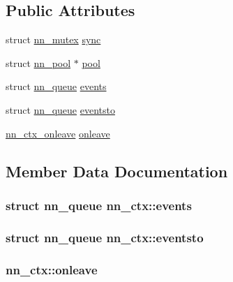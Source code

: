 \subsection*{Public Attributes}
\begin{DoxyCompactItemize}
\item 
struct \hyperlink{structnn__mutex}{nn\+\_\+mutex} \hyperlink{structnn__ctx_a264057ae180e58357895cbcbd594101b}{sync}
\item 
struct \hyperlink{structnn__pool}{nn\+\_\+pool} $\ast$ \hyperlink{structnn__ctx_a19a7c8ad423a87033ddf12550c1d3bec}{pool}
\item 
struct \hyperlink{structnn__queue}{nn\+\_\+queue} \hyperlink{structnn__ctx_ae1142dc4694c701a581532111589add2}{events}
\item 
struct \hyperlink{structnn__queue}{nn\+\_\+queue} \hyperlink{structnn__ctx_a68de02831fae8dea24d3183c1c4a21ea}{eventsto}
\item 
\hyperlink{ctx_8h_ab63830bf02229318481d9ce1f27bf1ea}{nn\+\_\+ctx\+\_\+onleave} \hyperlink{structnn__ctx_aa1d4d51724a3a10dbc93d42d8e6d9a58}{onleave}
\end{DoxyCompactItemize}


\subsection{Member Data Documentation}
\subsubsection[{events}]{\setlength{\rightskip}{0pt plus 5cm}struct {\bf nn\+\_\+queue} nn\+\_\+ctx\+::events}\hypertarget{structnn__ctx_ae1142dc4694c701a581532111589add2}{}\label{structnn__ctx_ae1142dc4694c701a581532111589add2}
\subsubsection[{eventsto}]{\setlength{\rightskip}{0pt plus 5cm}struct {\bf nn\+\_\+queue} nn\+\_\+ctx\+::eventsto}\hypertarget{structnn__ctx_a68de02831fae8dea24d3183c1c4a21ea}{}\label{structnn__ctx_a68de02831fae8dea24d3183c1c4a21ea}
\subsubsection[{onleave}]{ nn\+\_\+ctx\+::onleave}\hypertarget{structnn__ctx_aa1d4d51724a3a10dbc93d42d8e6d9a58}{}\label{structnn__ctx_aa1d4d51724a3a10dbc93d42d8e6d9a58}

